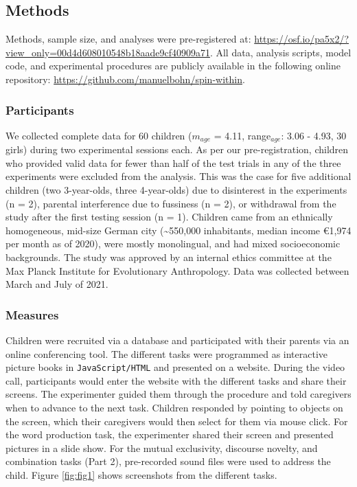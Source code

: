 \documentclass[
  man,mask,floatsintext]{apa6}
\begin{document}
\hypertarget{methods}{%
\subsection{Methods}\label{methods}}

Methods, sample size, and analyses were pre-registered at: \url{https://osf.io/pa5x2/?view_only=00d4d608010548b18aade9cf40909a71}. All data, analysis scripts, model code, and experimental procedures are publicly available in the following online repository: \url{https://github.com/manuelbohn/spin-within}.

\hypertarget{participants}{%
\subsubsection{Participants}\label{participants}}

We collected complete data for 60 children (\(m_{age}\) = 4.11, range\(_{age}\): 3.06 - 4.93, 30 girls) during two experimental sessions each. As per our pre-registration, children who provided valid data for fewer than half of the test trials in any of the three experiments were excluded from the analysis. This was the case for five additional children (two 3-year-olds, three 4-year-olds) due to disinterest in the experiments (n = 2), parental interference due to fussiness (n = 2), or withdrawal from the study after the first testing session (n = 1). Children came from an ethnically homogeneous, mid-size German city (\textasciitilde550,000 inhabitants, median income €1,974 per month as of 2020), were mostly monolingual, and had mixed socioeconomic backgrounds. The study was approved by an internal ethics committee at the Max Planck Institute for Evolutionary Anthropology. Data was collected between March and July of 2021.

\hypertarget{measures}{%
\subsubsection{Measures}\label{measures}}

Children were recruited via a database and participated with their parents via an online conferencing tool. The different tasks were programmed as interactive picture books in \texttt{JavaScript/HTML} and presented on a website. During the video call, participants would enter the website with the different tasks and share their screens. The experimenter guided them through the procedure and told caregivers when to advance to the next task. Children responded by pointing to objects on the screen, which their caregivers would then select for them via mouse click. For the word production task, the experimenter shared their screen and presented pictures in a slide show. For the mutual exclusivity, discourse novelty, and combination tasks (Part 2), pre-recorded sound files were used to address the child. Figure \ref{fig:fig1} shows screenshots from the different tasks.
\end{document}
